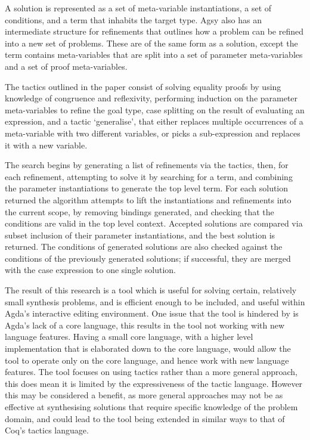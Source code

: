 \documentclass[a4paper]{article}
\begin{document}
A solution is represented as a set of meta-variable instantiations, a
set of conditions, and a term that inhabits the target type. Agsy also
has an intermediate structure for refinements that outlines how a 
problem can be refined into a new set of problems. These are of the same form as
a solution, except the term contains meta-variables that are split into a 
set of parameter meta-variables and a set of proof meta-variables.

The tactics outlined in the paper consist of solving equality proofs by
using knowledge of congruence and reflexivity, performing induction on
the parameter meta-variables to refine the goal type, case splitting on
the result of evaluating an expression, and a tactic `generalise', that
either replaces multiple occurrences of a meta-variable with two 
different variables, or picks a sub-expression and replaces it with a
new variable. 

The search begins by generating a list of refinements via the tactics,
then, for each refinement, attempting to solve it by searching for a 
term, and combining the parameter instantiations to generate the top
level term. For each solution returned the algorithm attempts to lift 
the instantiations and refinements into the current scope, by removing
bindings generated, and checking that the conditions are valid in the
top level context. Accepted solutions are compared via subset inclusion
of their parameter instantiations, and the best solution is returned. 
The conditions of generated solutions are also checked against the 
conditions of the previously generated solutions; if successful,
they are merged with the case expression to one single solution. 

The result of this research is a tool which is useful for solving 
certain, relatively small synthesis problems, and is efficient 
enough to be included, and useful within Agda's interactive editing
environment. One issue that the tool is hindered by is Agda's lack of 
a core language, this results in the tool not working with new language features.
Having a small core language, with a higher level implementation that 
is elaborated down to the core language, would allow the tool to 
operate only on the core language, and hence work with new language 
features. The tool focuses on using tactics rather than a more general 
approach, this does mean it is limited by the expressiveness of the 
tactic language. However this may be considered a benefit, 
as more general approaches may not be as effective at synthesising 
solutions that require specific knowledge of the problem domain, and 
could lead to the tool being extended in similar ways to that of Coq's
tactics language\cite{BibEntry2021Mar}.
\end{document}
